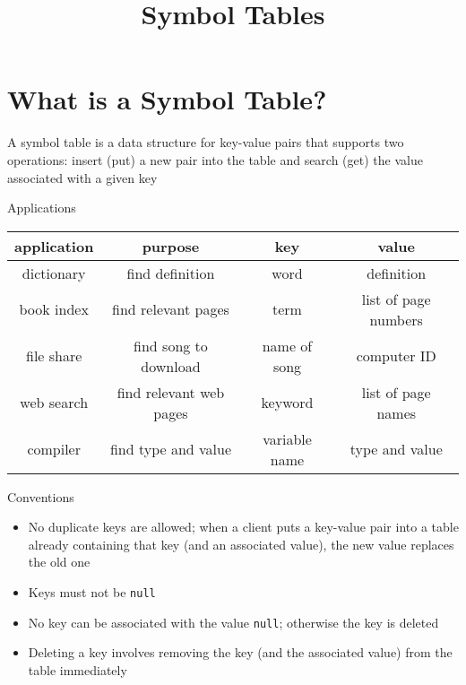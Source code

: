 \documentclass[8pt,a4paper,compress]{beamer}
\title{Symbol Tables}
\date{}
\begin{document}
\begin{frame}
\vfill
\titlepage
\end{frame}

\section{What is a Symbol Table?}
\begin{frame}[fragile]
\pause

A symbol table is a data structure for key-value pairs that supports two operations: insert (put) a new pair into the table and search (get) the value associated with a given key

\pause
\bigskip

Applications 
\begin{center}
\begin{tabular}{cccc}
application & purpose & key & value \\ \hline
dictionary & find definition & word & definition \\
book index & find relevant pages & term & list of page numbers \\
file share & find song to download & name of song & computer ID \\
web search & find relevant web pages & keyword & list of page names \\
compiler & find type and value & variable name & type and value \\
\end{tabular} 
\end{center}
\end{frame}

\begin{frame}[fragile]
\pause

Conventions
\begin{itemize}
\pause
\item No duplicate keys are allowed; when a client puts a key-value pair into a table already containing that key (and an associated value), the new value replaces the old one

\pause
\item Keys must not be \lstinline{null}

\pause
\item No key can be associated with the value \lstinline{null}; otherwise the key is deleted

\pause
\item Deleting a key involves removing the key (and the associated value) from the table immediately
\end{itemize}
\end{frame}
\end{document}
